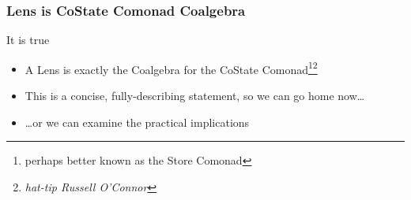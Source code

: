 \begin{frame}
\frametitle{Lens is CoState Comonad Coalgebra}

\begin{block}{It is true}
  \begin{itemize}
  \item A Lens is exactly the Coalgebra for the CoState Comonad\footnote{perhaps better known as the Store Comonad}\footnote{\emph{hat-tip Russell O'Connor}}
  \item This is a concise, fully-describing statement, so we can go home now\ldots
  \item \ldots or we can examine the practical implications
  \end{itemize}
\end{block}
\end{frame}

